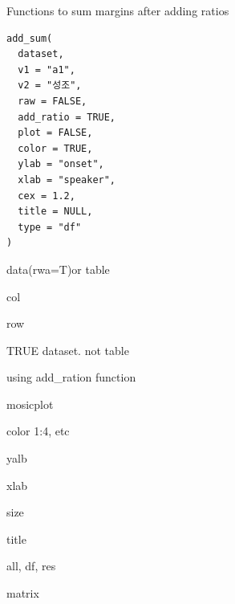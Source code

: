 \documentclass[a4paper]{book}
\begin{document}
%
\begin{Description}
Functions to sum margins after adding ratios
\end{Description}
%
\begin{Usage}
\begin{verbatim}
add_sum(
  dataset,
  v1 = "a1",
  v2 = "성조",
  raw = FALSE,
  add_ratio = TRUE,
  plot = FALSE,
  color = TRUE,
  ylab = "onset",
  xlab = "speaker",
  cex = 1.2,
  title = NULL,
  type = "df"
)
\end{verbatim}
\end{Usage}
%
\begin{Arguments}
\begin{ldescription}
\item[\code{dataset}] data(rwa=T)or table

\item[\code{v1}] col

\item[\code{v2}] row

\item[\code{raw}] TRUE dataset. not table

\item[\code{add\_ratio}] using add\_ration function

\item[\code{plot}] mosicplot

\item[\code{color}] color 1:4, etc

\item[\code{ylab}] yalb

\item[\code{xlab}] xlab

\item[\code{cex}] size

\item[\code{title}] title

\item[\code{type}] all, df, res
\end{ldescription}
\end{Arguments}
%
\begin{Value}
matrix
\end{Value}
%
\end{document}
